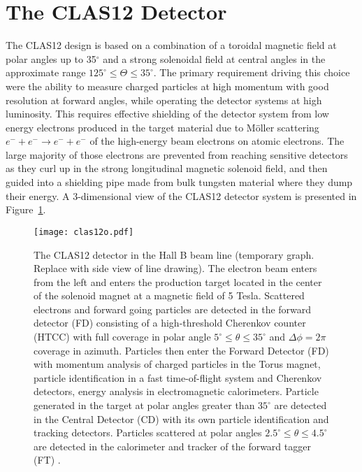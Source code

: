 \section{The CLAS12 Detector}
\label{clas12}
The CLAS12 design is based on a combination of a toroidal magnetic field at polar angles up to 35$^\circ$ and a strong
solenoidal field at central angles in the approximate range $125^\circ \le \Theta \le 35^\circ$. The primary requirement
driving this choice were the ability to measure charged
particles at high momentum with good resolution at forward angles, while operating the detector systems at high luminosity.
This requires effective shielding of the detector system from low energy electrons produced in the target material due to M\"oller
scattering $e^- + e^- \to e^- + e^-$ of the high-energy beam electrons on atomic electrons. The large majority of those
electrons are prevented from reaching
sensitive detectors as they curl up in the strong longitudinal magnetic solenoid field, and then guided into a shielding pipe
made from bulk tungsten material where they dump their energy.  A 3-dimensional view of the CLAS12 detector system is
presented in Figure~\ref{clas12}.
\begin{figure}[t]
\hspace{1.5cm}\texttt{[image: clas12o.pdf]}
\caption{\footnotesize The CLAS12 detector in the Hall B beam line (temporary graph. Replace with side view of line drawing).
The electron
beam enters from the left and enters the production target located in the center of the solenoid magnet at a magnetic field of
5 Tesla. Scattered electrons and forward going particles are detected in the forward detector (FD) consisting of a high-threshold
Cherenkov counter (HTCC) with full coverage in polar angle $5^\circ \le \theta \le 35^\circ$ and $\Delta \phi = 2\pi$ coverage in azimuth.
Particles then enter the Forward Detector (FD) with momentum analysis of charged particles in the Torus magnet, particle
identification in a fast time-of-flight system and Cherenkov detectors, energy analysis in electromagnetic calorimeters.
Particle generated in the target at polar angles greater than $35^\circ$ are detected in the Central Detector (CD) with its own
particle identification and tracking detectors. Particles scattered at polar angles $2.5^\circ \le \theta \le 4.5^\circ $ are detected
in the calorimeter and tracker of the forward tagger (FT) .  }
\label{clas12}
\end{figure}
